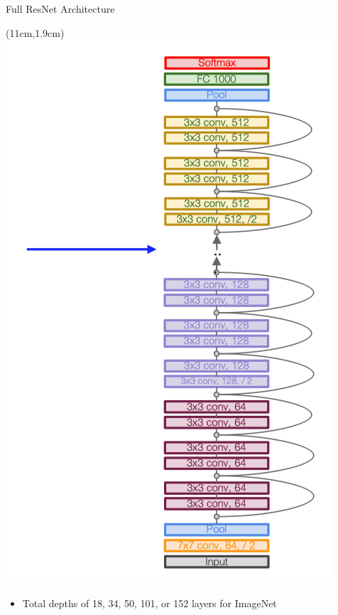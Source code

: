\documentclass[serif, aspectratio=169]{beamer}
\begin{document}
\begin{frame}{Full ResNet Architecture}
	\begin{textblock*}{5cm}(11cm,1.9cm) %
		\includegraphics[keepaspectratio, scale=0.23]{pic/res_arch2}
	\end{textblock*}
	
	\begin{itemize}
		\item Total depths of 18, 34, 50, 101, or 152 layers for ImageNet
	\end{itemize}
\end{frame}
\end{document}
